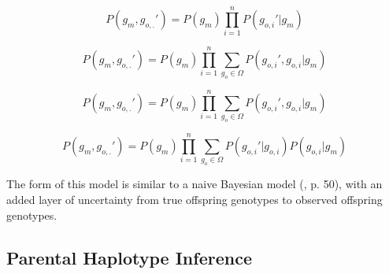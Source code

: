 \documentclass[11pt]{article}
\begin{document}
$$
P(g_m, g_{o,.}') = P(g_m) \prod_{i = 1}^n P(g_{o,i}' | g_m)
$$

$$
P(g_m, g_{o,.}') = P(g_m) \prod_{i = 1}^n \sum_{g_o \in \Omega} P(g_{o,i}', g_{o,i} | g_m)
$$

$$
P(g_m, g_{o,.}') = P(g_m) \prod_{i = 1}^n \sum_{g_o \in \Omega} P(g_{o,i}', g_{o,i} | g_m)
$$


\begin{equation}
  P(g_m, g_{o,.}') = P(g_m) \prod_{i = 1}^n \sum_{g_o \in \Omega} P(g_{o,i}' | g_{o,i}) P(g_{o,i} | g_{m})
\end{equation}

The form of this model is similar to a naive Bayesian model
(\citealt{koller2009}, p. 50), with an added layer of uncertainty from true
offspring genotypes to observed offspring genotypes.

%
%

\subsection{Parental Haplotype Inference}





\end{document}
